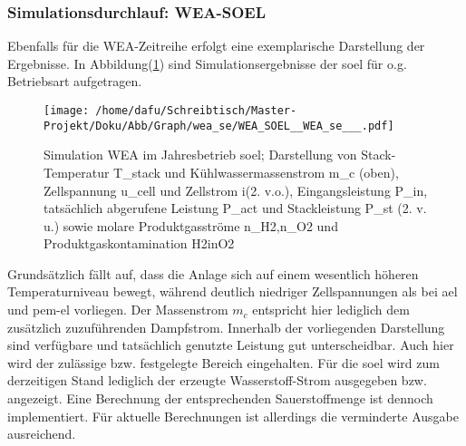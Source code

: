 \documentclass[onecolumn,10pt,titlepage]{article}
\begin{document}
\subsubsection{Simulationsdurchlauf: WEA-SOEL}
Ebenfalls für die WEA-Zeitreihe erfolgt eine exemplarische Darstellung der Ergebnisse. In Abbildung(\ref{fig:plt_se_WEA_SOEL}) sind Simulationsergebnisse der \gls{soel} für o.g. Betriebsart aufgetragen. 
\begin{figure}[H]
	
	\centering
	\texttt{[image: /home/dafu/Schreibtisch/Master-Projekt/Doku/Abb/Graph/wea\_se/WEA\_SOEL\_\_WEA\_se\_\_\_.pdf]}
	
	\caption[Simulation WEA im Jahresbetrieb \gls{soel}]{Simulation WEA im Jahresbetrieb \gls{soel}; Darstellung von Stack-Temperatur \gls{T_stack} und Kühlwassermassenstrom \gls{m_c} (oben), Zellspannung \gls{u_cell} und Zellstrom \gls{i}(2. v.o.), Eingangsleistung \gls{P_in},  tatsächlich abgerufene Leistung \gls{P_act} und Stackleistung \gls{P_st} (2. v. u.) sowie molare Produktgasströme \gls{n_H2},\gls{n_O2} und Produktgaskontamination \gls{H2inO2}}
		\label{fig:plt_se_WEA_SOEL} 
\end{figure}
Grundsätzlich fällt auf, dass die Anlage sich auf einem wesentlich höheren Temperaturniveau bewegt, während deutlich niedriger Zellspannungen als bei \gls{ael} und \gls{pem}-\gls{el} vorliegen. Der Massenstrom $m_c$ entspricht hier lediglich dem zusätzlich zuzuführenden Dampfstrom. Innerhalb der vorliegenden Darstellung sind verfügbare und tatsächlich genutzte Leistung gut unterscheidbar. Auch hier wird der zulässige bzw. festgelegte Bereich eingehalten. Für die \gls{soel} wird zum derzeitigen Stand lediglich der erzeugte Wasserstoff-Strom ausgegeben bzw. angezeigt. Eine Berechnung der entsprechenden Sauerstoffmenge ist dennoch implementiert. Für aktuelle Berechnungen ist allerdings die verminderte Ausgabe ausreichend. 
\end{document}
